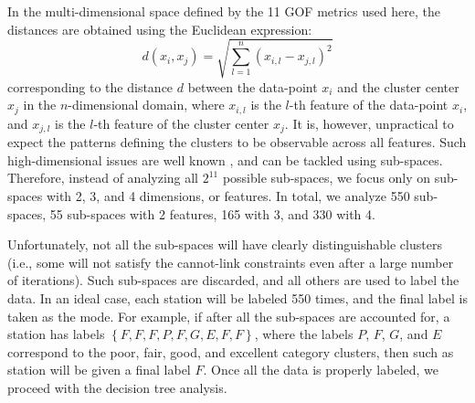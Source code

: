 In the multi-dimensional space defined by the 11 GOF metrics used here, the distances are obtained using the Euclidean expression:
% 
\begin{equation}
	d(x_i, x_j) = \sqrt{ \sum_{l=1}^{n} \left( x_{i,l} - x_{j,l} \right)^2 } 
\end{equation}
% 
corresponding to the distance $d$ between the data-point $x_i$ and the cluster center $x_j$ in the $n$-dimensional domain, where $x_{i,l}$ is the $l$-th feature of the data-point $x_i$, and $x_{j,l}$ is the $l$-th feature of the cluster center $x_j$. It is, however, unpractical to expect the patterns defining the clusters to be observable across all features. Such high-dimensional issues are well known \citep[see, for instance,][]{Parsons_2004_ACM, Dy_2004_MLR}, and can be tackled using sub-spaces. Therefore, instead of analyzing all $2^11$ possible sub-spaces, we focus only on sub-spaces with 2, 3, and 4 dimensions, or features. In total, we analyze 550 sub-spaces, 55 sub-spaces with 2 features, 165 with 3, and 330 with 4.

Unfortunately, not all the sub-spaces will have clearly distinguishable clusters (i.e., some will not satisfy the cannot-link constraints even after a large number of iterations). Such sub-spaces are discarded, and all others are used to label the data. In an ideal case, each station will be labeled 550 times, and the final label is taken as the mode. For example, if after all the sub-spaces are accounted for, a station has labels $\left\{F, F, F, P, F, G, E, F, F\right\}$, where the labels $P$, $F$, $G$, and $E$ correspond to the poor, fair, good, and excellent category clusters, then such as station will be given a final label $F$. Once all the data is properly labeled, we proceed with the decision tree analysis.


%



